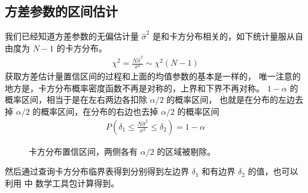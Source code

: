 \documentclass[letterpaper,10pt,english]{sphinxmanual}
\begin{document}
\subsection{方差参数的区间估计}
\label{\detokenize{_u63a8_u65ad_u4e0e_u68c0_u9a8c/content:id19}}
我们已经知道方差参数的无偏估计量 \(\hat{\sigma}^2\)
是和卡方分布相关的，如下统计量服从自由度为 \(N-1\) 的卡方分布。
\begin{equation}\label{equation:推断与检验/content:推断与检验/content:82}
\begin{split}\chi^2 = \frac{N\hat{\sigma}^2}{\sigma^2} \sim \chi^2(N-1)\end{split}
\end{equation}
获取方差估计量置信区间的过程和上面的均值参数的基本是一样的，
唯一注意的地方是，卡方分布概率密度函数不再是对称的，上界和下界不再对称。
\(1-\alpha\) 的概率区间，相当于是在左右两边各扣除 \(\alpha/2\) 的概率区间，
也就是在分布的左边去掉 \(\alpha/2\) 的概率区间，在分布的右边也去掉 \(\alpha/2\)
的概率区间
\begin{equation}\label{equation:推断与检验/content:eq_estimator_eval_095}
\begin{split}P( \delta_1 \leq  \frac{N\hat{\sigma}^2}{\sigma^2} \leq \delta_2 ) = 1-\alpha\end{split}
\end{equation}
\begin{figure}[htbp]
\centering
\capstart

\noindent{}
\caption{卡方分布置信区间，两侧各有 \(\alpha/2\) 的区域被剔除。}\label{\detokenize{_u63a8_u65ad_u4e0e_u68c0_u9a8c/content:id29}}\label{\detokenize{_u63a8_u65ad_u4e0e_u68c0_u9a8c/content:id20}}\end{figure}

然后通过查询卡方分布临界表得到分别得到左边界 \(\delta_1\)
和有边界 \(\delta_2\) 的值，也可以利用 
中  数学工具包计算得到。

\begin{sphinxVerbatim}[commandchars=\\\{\}]
   
  
  
  
  
\end{sphinxVerbatim}
\end{document}
